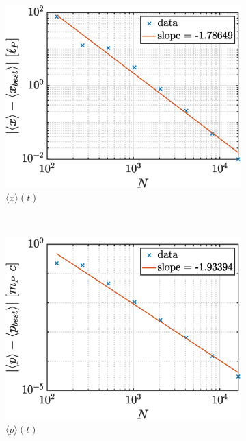 \documentclass[a4paper,12pt,twoside]{article}
\begin{document}
    \begin{figure}[h]
      \centering
      \begin{subfigure}{0.45\textwidth}
        \includegraphics[width=\textwidth]{graphs/i_conv_x.eps}
        \caption{$\langle x \rangle (t)$}
        \label{fig:i_conv_x}
      \end{subfigure}
      ~
      \begin{subfigure}{0.45\textwidth}
        \includegraphics[width=\textwidth]{graphs/i_conv_p.eps}
        \caption{$\langle p \rangle (t)$}
        \label{fig:i_conv_p}
      \end{subfigure}
      ~
      \begin{subfigure}{0.45\textwidth}

\end{subfigure}
\end{figure}
\end{document}
